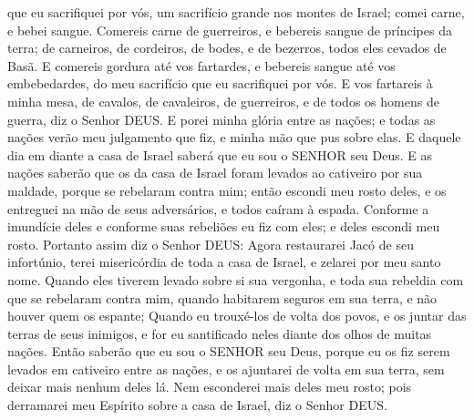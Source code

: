 { que eu sacrifiquei por vós, um sacrifício grande nos montes de Israel; comei carne, e bebei sangue.
  Comereis carne de guerreiros, e bebereis sangue de príncipes da terra; de carneiros, de cordeiros, de bodes, e de bezerros, todos eles cevados de Basã.
  E comereis gordura até vos fartardes, e bebereis sangue até vos embebedardes, do meu sacrifício que eu sacrifiquei por vós.
  E vos fartareis à minha mesa, de cavalos, de cavaleiros, de guerreiros, e de todos os homens de guerra, diz o Senhor DEUS.
  E porei minha glória entre as nações; e todas as nações verão meu julgamento que fiz, e minha mão que pus sobre elas.
  E daquele dia em diante a casa de Israel saberá que eu sou o SENHOR seu Deus.
  E as nações saberão que os da casa de Israel foram levados ao cativeiro por sua
{} maldade, porque se rebelaram contra mim; então escondi meu rosto deles, e os entreguei na mão de seus adversários, e todos caíram à espada.
  Conforme a imundície deles e conforme suas rebeliões eu fiz com eles; e deles escondi meu rosto.
  Portanto assim diz o Senhor DEUS: Agora restaurarei Jacó de seu infortúnio, terei misericórdia de toda a casa de Israel, e zelarei por meu santo nome.
  Quando eles tiverem levado sobre si sua vergonha, e toda sua rebeldia com que se rebelaram contra mim, quando habitarem seguros em sua terra, e não houver quem os espante;
  Quando eu trouxé-los de volta dos povos, e os juntar das terras de seus inimigos, e for eu santificado neles diante dos olhos de muitas nações.
  Então saberão que eu sou o SENHOR seu Deus, porque eu os fiz serem levados em cativeiro entre as nações, e os ajuntarei de volta em sua terra, sem deixar mais nenhum deles lá.
  Nem esconderei mais deles meu rosto; pois derramarei
 meu Espírito sobre a casa de Israel, diz o Senhor DEUS.
\par }

